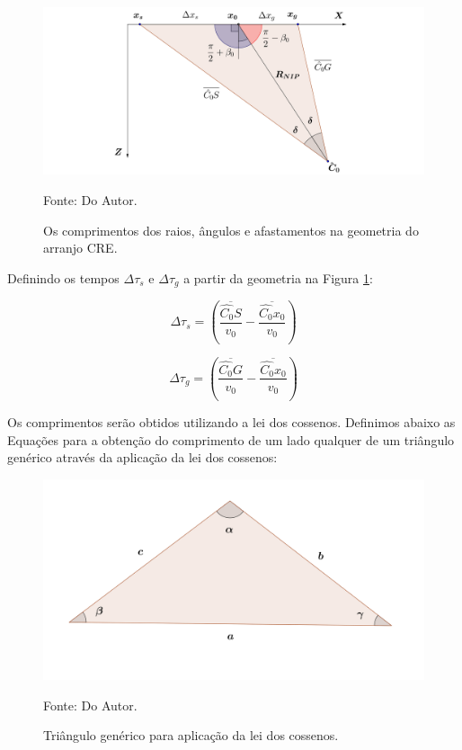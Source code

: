 \documentclass[a4paper, 12pt]{article}
\begin{document}
\begin{figure}[H]
\caption{Os comprimentos dos raios, ângulos e afastamentos na geometria do arranjo CRE.}
\begin{center}
\includegraphics[scale=0.5]{images/creEsq.png}
\vspace{-0.3cm}
\end{center}
\begin{center}
 Fonte: Do Autor.
\end{center}
\label{fig:1.2}
\end{figure}

Definindo os tempos $\Delta \tau_s$ e $\Delta \tau_g$ a partir da geometria na Figura \ref{fig:1.2}:

\begin{equation}
\label{eq:1.5}
\Delta \tau_s = \left( \frac{\overline{\hat{C_0}S}}{v_0} - \frac{\overline{\hat{C_0}x_0}}{v_0} \right)
\end{equation}

\begin{equation}
\label{eq:1.6}
\Delta \tau_g = \left( \frac{\overline{\hat{C_0}G}}{v_0} - \frac{\overline{\hat{C_0}x_0}}{v_0} \right)
\end{equation}

Os comprimentos serão obtidos utilizando a lei dos cossenos. Definimos abaixo as Equações para a
obtenção do comprimento de um lado qualquer de um triângulo genérico através da aplicação da lei dos cossenos:

\begin{figure}[H]
\caption{Triângulo genérico para aplicação da lei dos cossenos.}
\begin{center}
\includegraphics[scale=0.8]{images/leiCossenos.png}
\vspace{-0.3cm}
\end{center}
\begin{center}
 Fonte: Do Autor.
\end{center}
\label{fig:1.3}
\end{figure}
\end{document}
